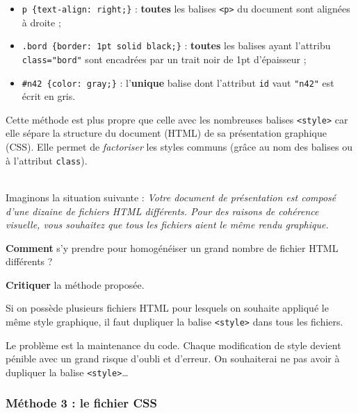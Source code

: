 \documentclass[a4paper,17pt]{extarticle}
\newenvironment{eleve}%
{\begin{activite}\color{noiramu}\\}
{\end{activite}}
\providecommand{\tightlist}{%
      \setlength{\itemsep}{0pt}\setlength{\parskip}{0pt}}
\begin{document}
\begin{itemize}
\tightlist
\item
  \texttt{p\ \{text-align:\ right;\}} : \textbf{toutes} les balises
  \texttt{\textless{}p\textgreater{}} du document sont alignées à droite
  ;
\item
  \texttt{.bord\ \{border:\ 1pt\ solid\ black;\}} : \textbf{toutes} les
  balises ayant l'attribu \texttt{class="bord"} sont encadrées par un
  trait noir de 1pt d'épaisseur ;
\item
  \texttt{\#n42\ \{color:\ gray;\}} : l'\textbf{unique} balise dont
  l'attribut \texttt{id} vaut \texttt{"n42"} est écrit en gris.
\end{itemize}

    Cette méthode est plus propre que celle avec les nombreuses balises
\texttt{\textless{}style\textgreater{}} car elle sépare la structure du
document (HTML) de sa présentation graphique (CSS). Elle permet de
\emph{factoriser} les styles communs (grâce au nom des balises ou à
l'attribut \texttt{class}).
\begin{eleve}
    Imaginons la situation suivante : \emph{Votre document de présentation
est composé d'une dizaine de fichiers HTML différents. Pour des raisons
de cohérence visuelle, vous souhaitez que tous les fichiers aient le
même rendu graphique.}

\textbf{Comment} s'y prendre pour homogénéiser un grand nombre de
fichier HTML différents ?

\textbf{Critiquer} la méthode proposée.
        
        \end{eleve}\begin{reponse}
    Si on possède plusieurs fichiers HTML pour lesquels on souhaite appliqué
le même style graphique, il faut dupliquer la balise
\texttt{\textless{}style\textgreater{}} dans tous les fichiers.

Le problème est la maintenance du code. Chaque modification de style
devient pénible avec un grand risque d'oubli et d'erreur. On souhaiterai
ne pas avoir à dupliquer la balise
\texttt{\textless{}style\textgreater{}}\ldots{}

            \end{reponse}
    \hypertarget{muxe9thode-3-le-fichier-css}{%
\subsubsection{Méthode 3 : le fichier
CSS}\label{muxe9thode-3-le-fichier-css}}
\end{document}
